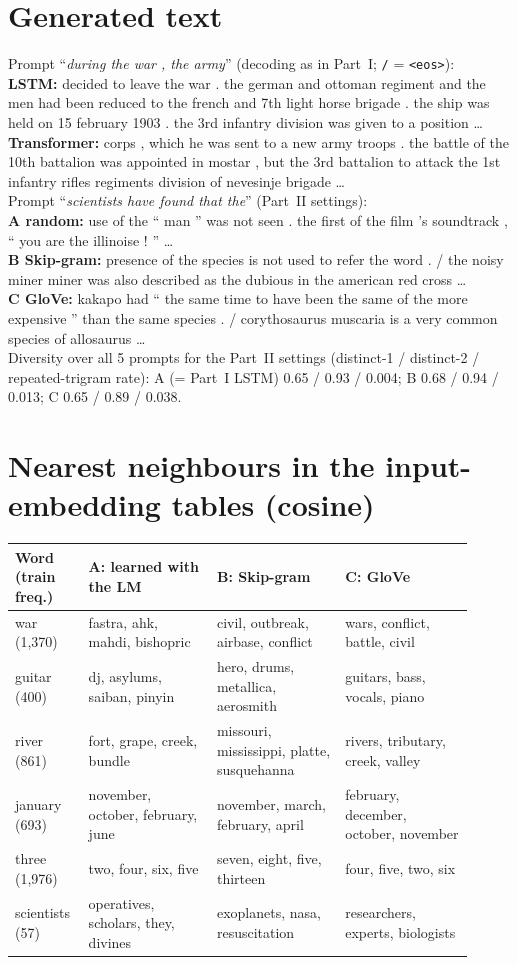 \documentclass[10pt,a4paper]{article}
\begin{document}
\section{Generated text}\label{app:gen}
\small
Prompt ``\emph{during the war , the army}'' (decoding as in Part~I; \texttt{/} = \texttt{<eos>}):\\[1pt]
\textbf{LSTM:} decided to leave the war . the german and ottoman regiment and the men had been reduced to the
french and 7th light horse brigade . the ship was held on 15 february 1903 . the 3rd infantry division was given
to a position \ldots\\
\textbf{Transformer:} corps , which he was sent to a new army troops . the battle of the 10th battalion was
appointed in mostar , but the 3rd battalion to attack the 1st infantry rifles regiments division of nevesinje
brigade \ldots\\[2pt]
Prompt ``\emph{scientists have found that the}'' (Part~II settings):\\[1pt]
\textbf{A random:} use of the `` man '' was not seen . the first of the film 's soundtrack , `` you are the
illinoise ! '' \ldots\\
\textbf{B Skip-gram:} presence of the species is not used to refer the word . / the noisy miner miner was also
described as the dubious in the american red cross \ldots\\
\textbf{C GloVe:} kakapo had `` the same time to have been the same of the more expensive '' than the same species
. / corythosaurus muscaria is a very common species of allosaurus \ldots\\[2pt]
Diversity over all 5 prompts for the Part~II settings (distinct-1 / distinct-2 / repeated-trigram rate):
A (= Part~I LSTM) 0.65 / 0.93 / 0.004; B 0.68 / 0.94 / 0.013; C 0.65 / 0.89 / 0.038.

\section{Nearest neighbours in the input-embedding tables (cosine)}\label{app:nn}
\noindent\begin{tabular}{@{}p{0.13\linewidth}p{0.26\linewidth}p{0.26\linewidth}p{0.26\linewidth}@{}}
\toprule
Word (train freq.) & A: learned with the LM & B: Skip-gram & C: GloVe\\
\midrule
war (1,370) & fastra, ahk, mahdi, bishopric & civil, outbreak, airbase, conflict & wars, conflict, battle, civil\\
guitar (400) & dj, asylums, saiban, pinyin & hero, drums, metallica, aerosmith & guitars, bass, vocals, piano\\
river (861) & fort, grape, creek, bundle & missouri, mississippi, platte, susquehanna & rivers, tributary, creek, valley\\
january (693) & november, october, february, june & november, march, february, april & february, december, october, november\\
three (1,976) & two, four, six, five & seven, eight, five, thirteen & four, five, two, six\\
scientists (57) & operatives, scholars, they, divines & exoplanets, nasa, resuscitation & researchers, experts, biologists\\
\bottomrule
\end{tabular}
\end{document}
